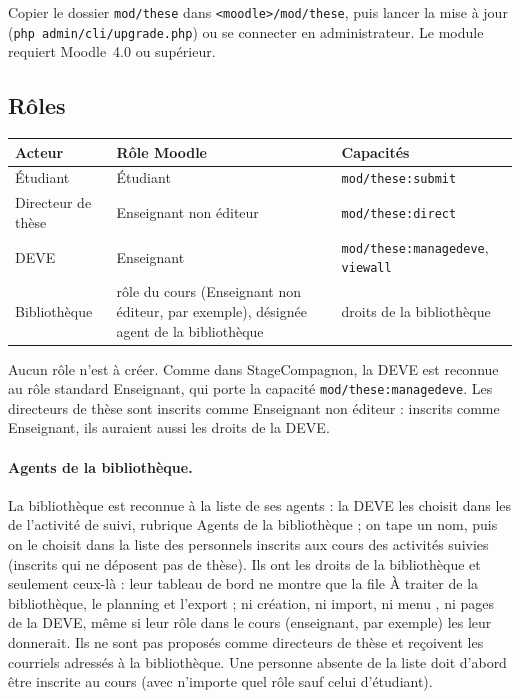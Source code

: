 \documentclass[11pt,a4paper]{article}
\begin{document}
Copier le dossier \texttt{mod/these} dans \texttt{<moodle>/mod/these}, puis
lancer la mise à jour (\texttt{php admin/cli/upgrade.php}) ou se connecter en
administrateur. Le module requiert Moodle~4.0 ou supérieur.

\subsection{Rôles}\label{sec:roles}

\begin{center}
\small
\begin{tabularx}{\linewidth}{@{}l l X@{}}
\toprule
\textbf{Acteur} & \textbf{Rôle Moodle} & \textbf{Capacités} \\
\midrule
Étudiant & Étudiant & \texttt{mod/these:submit} \\
Directeur de thèse & Enseignant non éditeur & \texttt{mod/these:direct} \\
DEVE & Enseignant & \texttt{mod/these:managedeve}, \texttt{viewall} \\
Bibliothèque & rôle du cours (Enseignant non éditeur, par exemple), désignée agent de la bibliothèque & droits de la bibliothèque \\
\bottomrule
\end{tabularx}
\end{center}

Aucun rôle n'est à créer. Comme dans StageCompagnon, la DEVE est reconnue au
rôle standard \og Enseignant\fg{}, qui porte la capacité
\texttt{mod/these:managedeve}. Les directeurs de thèse sont inscrits comme
\og Enseignant non éditeur\fg{} : inscrits comme \og Enseignant\fg{}, ils
auraient aussi les droits de la DEVE.

\paragraph{Agents de la bibliothèque.} La bibliothèque est reconnue à la liste
de ses agents : la DEVE les choisit dans les  de
l'activité de suivi, rubrique \og Agents de la bibliothèque\fg{} ; on tape un
nom, puis on le choisit dans la liste des personnels inscrits aux cours des
activités suivies (inscrits qui ne déposent pas de thèse). Ils ont les droits de
la bibliothèque et seulement ceux-là : leur tableau de bord ne montre que la
file \og À traiter\fg{} de la bibliothèque, le planning et l'export ; ni
création, ni import, ni menu , ni pages de la DEVE, même si
leur rôle dans le cours (enseignant, par exemple) les leur donnerait. Ils ne
sont pas proposés comme directeurs de thèse et reçoivent les courriels adressés
à la bibliothèque. Une personne absente de la liste doit d'abord être inscrite
au cours (avec n'importe quel rôle sauf celui d'étudiant).
\end{document}
